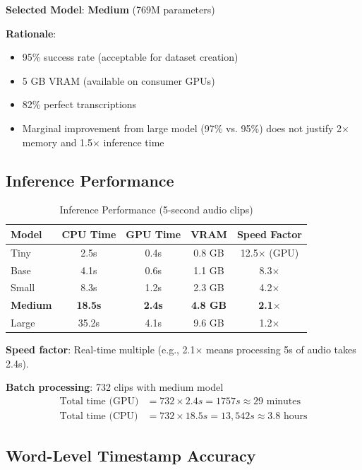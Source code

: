 \documentclass[11pt,a4paper]{article}
\begin{document}
\textbf{Selected Model}: \textbf{Medium} (769M parameters)

\textbf{Rationale}:
\begin{itemize}
    \item 95\% success rate (acceptable for dataset creation)
    \item 5 GB VRAM (available on consumer GPUs)
    \item 82\% perfect transcriptions
    \item Marginal improvement from large model (97\% vs. 95\%) does not justify 2$\times$ memory and 1.5$\times$ inference time
\end{itemize}

\subsection{Inference Performance}

\begin{table}[htbp]
\centering
\caption{Inference Performance (5-second audio clips)}
\begin{tabular}{@{}lcccc@{}}
\toprule
\textbf{Model} & \textbf{CPU Time} & \textbf{GPU Time} & \textbf{VRAM} & \textbf{Speed Factor} \\ \midrule
Tiny & 2.5s & 0.4s & 0.8 GB & 12.5$\times$ (GPU) \\
Base & 4.1s & 0.6s & 1.1 GB & 8.3$\times$ \\
Small & 8.3s & 1.2s & 2.3 GB & 4.2$\times$ \\
\textbf{Medium} & \textbf{18.5s} & \textbf{2.4s} & \textbf{4.8 GB} & \textbf{2.1$\times$} \\
Large & 35.2s & 4.1s & 9.6 GB & 1.2$\times$ \\
\bottomrule
\end{tabular}
\end{table}

\textbf{Speed factor}: Real-time multiple (e.g., 2.1$\times$ means processing 5s of audio takes 2.4s).

\textbf{Batch processing}: 732 clips with medium model
\begin{align}
\text{Total time (GPU)} &= 732 \times 2.4s = 1757s \approx 29 \text{ minutes} \\
\text{Total time (CPU)} &= 732 \times 18.5s = 13{,}542s \approx 3.8 \text{ hours}
\end{align}

\subsection{Word-Level Timestamp Accuracy}
\end{document}
